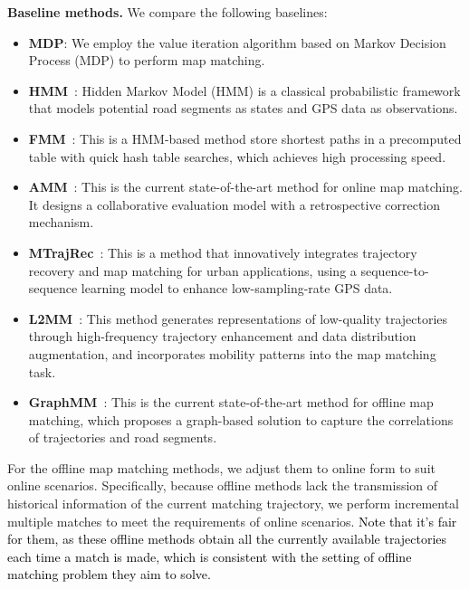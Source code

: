 \noindent \textbf{Baseline methods.}
We compare the following baselines:
\begin{itemize}[leftmargin=10pt]
    \item \textbf{MDP}: We employ the value iteration algorithm based on Markov Decision Process (MDP) to perform map matching.
    \item \textbf{HMM}~\cite{HMM}: Hidden Markov Model (HMM) is a classical probabilistic framework that models potential road segments as states and GPS data as observations.
    \item \textbf{FMM}~\cite{FMM}: This is a HMM-based method store shortest paths in a precomputed table with quick hash table searches, which achieves high processing speed.
    \item \textbf{AMM}~\cite{AMM}: This is the current state-of-the-art method for online map matching. It designs a collaborative evaluation model with a retrospective correction mechanism.
    \item \textbf{MTrajRec}~\cite{mtrajrec}: This is a method that innovatively integrates trajectory recovery and map matching for urban applications, using a sequence-to-sequence learning model to enhance low-sampling-rate GPS data. 
    \item \textbf{L2MM}~\cite{l2mm}: This method generates representations of low-quality trajectories through high-frequency trajectory enhancement and data distribution augmentation, and incorporates mobility patterns into the map matching task.
    \item \textbf{GraphMM}~\cite{graphmm}: This is the current state-of-the-art method for offline map matching, which proposes a graph-based solution to capture the correlations of trajectories and road segments.
\end{itemize}
For the offline map matching methods, we adjust them to online form to suit online scenarios. Specifically, because offline methods lack the transmission of historical information of the current matching trajectory, we perform incremental multiple matches to meet the requirements of online scenarios. \textcolor{black}{Note that it's fair for them, as these offline methods obtain all the currently available trajectories each time a match is made, which is consistent with the setting of offline matching problem they aim to solve.}

